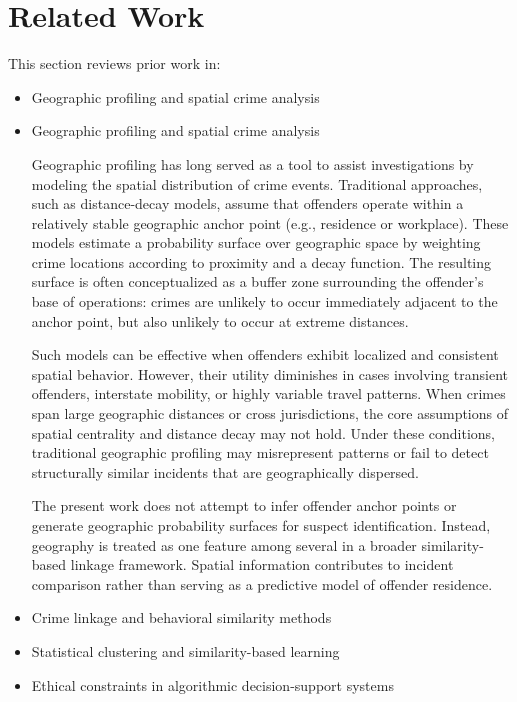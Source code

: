 \documentclass[12pt]{article}
\begin{document}
\section{Related Work}
This section reviews prior work in:
\begin{itemize}
    \item Geographic profiling and spatial crime analysis

\item Geographic profiling and spatial crime analysis

Geographic profiling has long served as a tool to assist investigations by modeling the spatial distribution of crime events. Traditional approaches, such as distance-decay models, assume that offenders operate within a relatively stable geographic anchor point (e.g., residence or workplace). These models estimate a probability surface over geographic space by weighting crime locations according to proximity and a decay function. The resulting surface is often conceptualized as a buffer zone surrounding the offender’s base of operations: crimes are unlikely to occur immediately adjacent to the anchor point, but also unlikely to occur at extreme distances.

Such models can be effective when offenders exhibit localized and consistent spatial behavior. However, their utility diminishes in cases involving transient offenders, interstate mobility, or highly variable travel patterns. When crimes span large geographic distances or cross jurisdictions, the core assumptions of spatial centrality and distance decay may not hold. Under these conditions, traditional geographic profiling may misrepresent patterns or fail to detect structurally similar incidents that are geographically dispersed.

The present work does not attempt to infer offender anchor points or generate geographic probability surfaces for suspect identification. Instead, geography is treated as one feature among several in a broader similarity-based linkage framework. Spatial information contributes to incident comparison rather than serving as a predictive model of offender residence.

    
    \item Crime linkage and behavioral similarity methods
    \item Statistical clustering and similarity-based learning
    \item Ethical constraints in algorithmic decision-support systems
\end{itemize}
\end{document}
